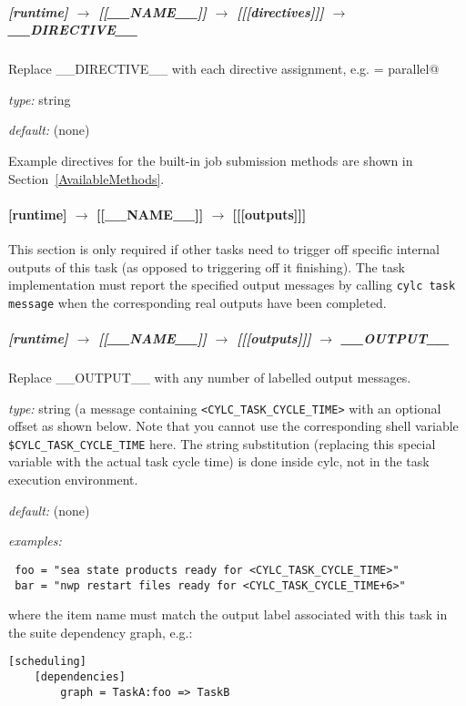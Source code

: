 \subparagraph[\_\_DIRECTIVE\_\_ ]{[runtime] $\rightarrow$ [[\_\_NAME\_\_]] $\rightarrow$ [[[directives]]] $\rightarrow$ \_\_DIRECTIVE\_\_}

Replace \_\_DIRECTIVE\_\_ with each directive assignment, e.g. 
\lstinline@class = parallel@

\begin{myitemize}
\item {\em type:} string
\item {\em default:} (none)
\end{myitemize}

Example directives for the built-in job submission methods are shown in
Section~\ref{AvailableMethods}.

\paragraph[{[[[}outputs{]]]}]{[runtime] $\rightarrow$ [[\_\_NAME\_\_]] $\rightarrow$ [[[outputs]]]}

This section is only required if other tasks need to trigger off specific
internal outputs of this task (as opposed to triggering off it finishing).
The task implementation must report the specified output messages 
by calling \lstinline=cylc task message= when the
corresponding real outputs have been completed.

\subparagraph[\_\_OUTPUT\_\_ ]{[runtime] $\rightarrow$ [[\_\_NAME\_\_]] $\rightarrow$ [[[outputs]]] $\rightarrow$ \_\_OUTPUT\_\_}

Replace \_\_OUTPUT\_\_ with any number of labelled output messages. 
\begin{myitemize}
    \item {\em type:} string (a message containing
        \lstinline=<CYLC_TASK_CYCLE_TIME>= with an optional offset as shown
        below. Note that you cannot use the corresponding shell variable
        \lstinline=$CYLC_TASK_CYCLE_TIME= here. The string substitution
        (replacing this special variable with the actual task cycle time) is
        done inside cylc, not in the task execution environment.
\item {\em default:} (none)
\item{ \em examples:}
 \begin{lstlisting}
 foo = "sea state products ready for <CYLC_TASK_CYCLE_TIME>"
 bar = "nwp restart files ready for <CYLC_TASK_CYCLE_TIME+6>"
 \end{lstlisting}
 where the item name must match the output label associated with
 this task in the suite dependency graph, e.g.:
\lstset{language=suiterc}
\begin{lstlisting}
[scheduling]
    [dependencies]
        graph = TaskA:foo => TaskB
 \end{lstlisting}
\end{myitemize}
\lstset{language=transcript}

